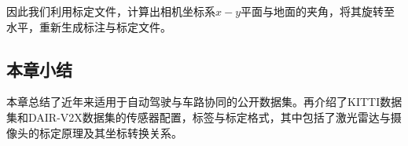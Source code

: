 因此我们利用标定文件，计算出相机坐标系$x-y$平面与地面的夹角，将其旋转至水平，重新生成标注与标定文件。

\subsection{本章小结}

本章总结了近年来适用于自动驾驶与车路协同的公开数据集。再介绍了KITTI数据集和DAIR-V2X数据集的传感器配置，标签与标定格式，其中包括了激光雷达与摄像头的标定原理及其坐标转换关系。